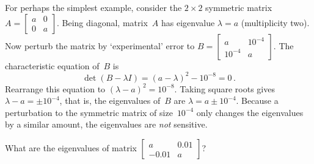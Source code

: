 \begin{example} \label{eg:}
For perhaps the simplest example, consider the \(2\times2\) symmetric matrix \(A=\begin{bmatrix} a&0\\0&a \end{bmatrix}\).
Being diagonal, matrix~\(A\) has eigenvalue \(\lambda=a\) (multiplicity two).
Now perturb the matrix by `experimental' error to \(B=\begin{bmatrix} a&10^{-4}\\ 10^{-4}&a \end{bmatrix}\).
The characteristic equation of~\(B\) is
\begin{equation*}
\det(B-\lambda I)=(a-\lambda)^2-10^{-8}=0\,.
\end{equation*}
Rearrange this equation to \((\lambda-a)^2=10^{-8}\).  
Taking square roots gives \(\lambda-a=\pm 10^{-4}\), that is, the eigenvalues of~\(B\) are \(\lambda=a\pm10^{-4}\).
Because a perturbation to the symmetric matrix of size~\(10^{-4}\) only changes the eigenvalues by a similar amount, the eigenvalues are \emph{not} sensitive.
\end{example}





\begin{activity}
What are the eigenvalues of matrix \(\begin{bmatrix} a&0.01\\-0.01&a \end{bmatrix}\)?
\end{activity}





